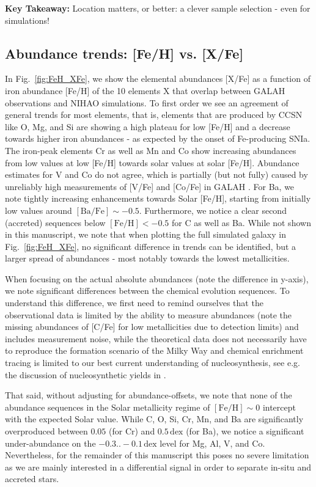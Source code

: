 \documentclass[fleqn,usenatbib]{mnras}
\begin{document}
\textbf{Key Takeaway:} Location matters, or better: a clever sample selection - even for simulations!

\subsection{Abundance trends: [Fe/H] vs. [X/Fe]} \label{sec:feh_xfe}

In Fig.~\ref{fig:FeH_XFe}, we show the elemental abundances [X/Fe] as a function of iron abundance [Fe/H] of the 10 elements X that overlap between GALAH observations and NIHAO simulations. To first order we see an agreement of general trends for most elements, that is, elements that are produced by CCSN like O, Mg, and Si are showing a high plateau for low [Fe/H] and a decrease towards higher iron abundances - as expected by the onset of Fe-producing SNIa. The iron-peak elements Cr as well as Mn and Co show increasing abundances from low values at low [Fe/H] towards solar values at solar [Fe/H]. Abundance estimates for V and Co do not agree, which is partially (but not fully) caused by unreliably high measurements of [V/Fe] and [Co/Fe] in GALAH \citet{Buder2021}. For Ba, we note tightly increasing enhancements towards Solar [Fe/H], starting from initially low values around $\mathrm{[Ba/Fe]} \sim -0.5$. Furthermore, we notice a clear second (accreted) sequences below $\mathrm{[Fe/H]} < -0.5$ for C as well as Ba. While not shown in this manuscript, we note that when plotting the full simulated galaxy in Fig.~\ref{fig:FeH_XFe}, no significant difference in trends can be identified, but a larger spread of abundances - most notably towards the lowest metallicities.

When focusing on the actual absolute abundances (note the difference in y-axis), we note significant differences between the chemical evolution sequences. To understand this difference, we first need to remind ourselves that the observational data is limited by the ability to measure abundances (note the missing abundances of [C/Fe] for low metallicities due to detection limits) and includes measurement noise, while the theoretical data does not necessarily have to reproduce the formation scenario of the Milky Way and chemical enrichment tracing is limited to our best current understanding of nucleosynthesis, see e.g. the discussion of nucleosynthetic yields in \citet{Buck2021}.

That said, without adjusting for abundance-offsets, we note that none of the abundance sequences in the Solar metallicity regime of $\mathrm{[Fe/H]} \sim 0$ intercept with the expected Solar value. While C, O, Si, Cr, Mn, and Ba are significantly overproduced between $0.05$ (for Cr) and $0.5\,\mathrm{dex}$ (for Ba), we notice a significant under-abundance on the $-0.3..-0.1\,\mathrm{dex}$ level for Mg, Al, V, and Co. Nevertheless, for the remainder of this manuscript this poses no severe limitation as we are mainly interested in a differential signal in order to separate in-situ and accreted stars.
\end{document}

